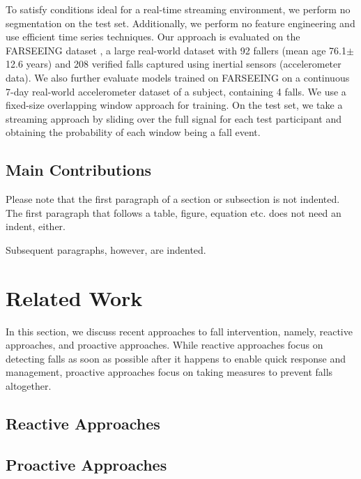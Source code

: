 \documentclass[runningheads]{llncs}
\begin{document}
To satisfy conditions ideal for a real-time streaming environment, we perform no segmentation on the test set. Additionally, we perform no feature engineering and use efficient time series techniques. Our approach is evaluated on the FARSEEING dataset \cite{klenk2016farseeing}, a large real-world dataset with 92 fallers (mean age 76.1$\pm$12.6 years) and 208 verified falls captured using inertial sensors (accelerometer data). We also further evaluate models trained on FARSEEING on a continuous 7-day real-world accelerometer dataset of a subject, containing 4 falls. We use a fixed-size overlapping window approach for training. On the test set, we take a streaming approach by sliding over the full signal for each test participant and obtaining the probability of each window being a fall event.


\subsection{Main Contributions}
Please note that the first paragraph of a section or subsection is
not indented. The first paragraph that follows a table, figure,
equation etc. does not need an indent, either.

Subsequent paragraphs, however, are indented.

\section{Related Work}
In this section, we discuss recent approaches to fall intervention, namely, reactive approaches, and proactive approaches. While reactive approaches focus on detecting falls as soon as possible after it happens to enable quick response and management, proactive approaches focus on taking measures to prevent falls altogether.
\subsection{Reactive Approaches}
\subsection{Proactive Approaches}
\end{document}
